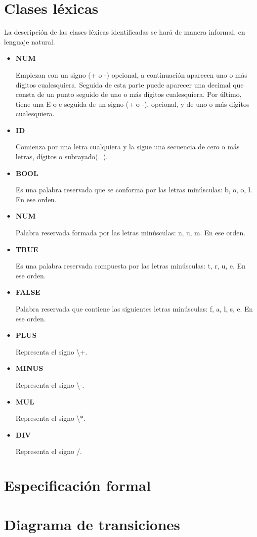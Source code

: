 \documentclass[\main/MemoriaPL.tex]{subfiles}
\begin{document}
  \section{Clases léxicas}
    \par \noindent
    La descripción de las clases léxicas identificadas se hará de manera informal, en lenguaje natural.

    \begin{itemize}
      \item \textbf{NUM}
            \par \noindent
            Empiezan con un signo (+ o -) opcional, a continuación aparecen uno o más dígitos cualesquiera.
            Seguida de esta parte puede aparecer una decimal que consta de un punto seguido de uno o más dígitos cualesquiera.
            Por último, tiene una E o e seguida de un signo (+ o -), opcional, y de uno o más dígitos cualesquiera.
      \item \textbf{ID}
            \par \noindent
            Comienza por una letra cualquiera y la sigue una secuencia de cero o más letras, dígitos o subrayado(\_).
      \item \textbf{BOOL}
            \par \noindent
            Es una palabra reservada que se conforma por las letras minúsculas: b, o, o, l. En ese orden.
      \item \textbf{NUM}
            \par \noindent
            Palabra reservada formada por las letras minúsculas: n, u, m. En ese orden.
      \item \textbf{TRUE}
            \par \noindent
            Es una palabra reservada compuesta por las letras minúsculas: t, r, u, e. En ese orden.
      \item \textbf{FALSE}
            \par \noindent
            Palabra reservada que contiene las siguientes letras minúsculas: f, a, l, s, e. En ese orden.
      \item \textbf{PLUS}
            \par \noindent
            Representa el signo \textbackslash +.
      \item \textbf{MINUS}
            \par \noindent
            Representa el signo \textbackslash -.
      \item \textbf{MUL}
            \par \noindent
            Representa el signo \textbackslash $\ast$.
      \item \textbf{DIV}
            \par \noindent
            Representa el signo /.
    \end{itemize}

\section{Especificación formal} %


\section{Diagrama de transiciones} %
\end{document}
